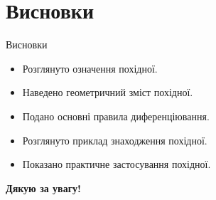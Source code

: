 \documentclass{beamer}
\begin{document}
\section{Висновки}
\begin{frame}{Висновки}
    \begin{itemize}
        \item Розглянуто означення похідної.
        \item Наведено геометричний зміст похідної.
        \item Подано основні правила диференціювання.
        \item Розглянуто приклад знаходження похідної.
        \item Показано практичне застосування похідної.
    \end{itemize}

    \vspace{0.5cm}
    \centering
    \textbf{\Large Дякую за увагу!}
\end{frame}
\end{document}
